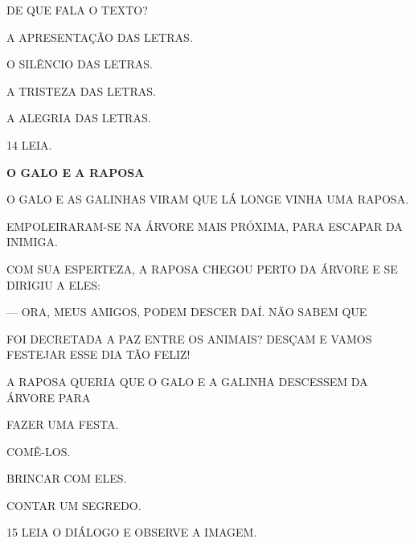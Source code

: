 
DE QUE FALA O TEXTO?

\begin{escolha}
\item A APRESENTAÇÃO DAS LETRAS.

\item O SILÊNCIO DAS LETRAS.

\item A TRISTEZA DAS LETRAS. 

\item A ALEGRIA DAS LETRAS.
\end{escolha}


\num{14} LEIA.

\textbf{O GALO E A RAPOSA}

O GALO E AS GALINHAS VIRAM QUE LÁ LONGE VINHA UMA RAPOSA.

EMPOLEIRARAM-SE NA ÁRVORE MAIS PRÓXIMA, PARA ESCAPAR DA INIMIGA.

COM SUA ESPERTEZA, A RAPOSA CHEGOU PERTO DA ÁRVORE E
SE DIRIGIU A ELES:

--- ORA, MEUS AMIGOS, PODEM DESCER DAÍ. NÃO SABEM QUE

FOI DECRETADA A PAZ ENTRE OS ANIMAIS? DESÇAM E VAMOS FESTEJAR ESSE
DIA TÃO FELIZ!


A RAPOSA QUERIA QUE O GALO E A GALINHA DESCESSEM DA ÁRVORE PARA

\begin{escolha}
\item FAZER UMA FESTA.

\item COMÊ-LOS.

\item BRINCAR COM ELES.

\item CONTAR UM SEGREDO.
\end{escolha}


\num{15} LEIA O DIÁLOGO E OBSERVE A IMAGEM.

